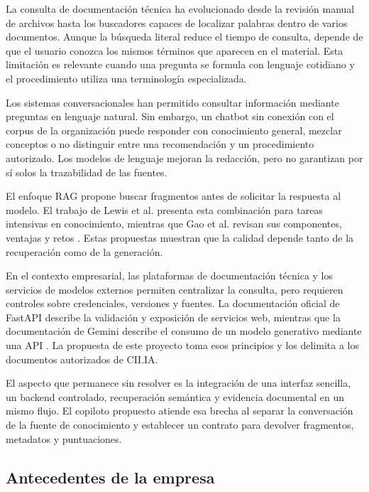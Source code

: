La consulta de documentación técnica ha evolucionado desde la revisión manual de archivos hasta los buscadores capaces de localizar palabras dentro de varios documentos. Aunque la búsqueda literal reduce el tiempo de consulta, depende de que el usuario conozca los mismos términos que aparecen en el material. Esta limitación es relevante cuando una pregunta se formula con lenguaje cotidiano y el procedimiento utiliza una terminología especializada.

Los sistemas conversacionales han permitido consultar información mediante preguntas en lenguaje natural. Sin embargo, un chatbot sin conexión con el corpus de la organización puede responder con conocimiento general, mezclar conceptos o no distinguir entre una recomendación y un procedimiento autorizado. Los modelos de lenguaje mejoran la redacción, pero no garantizan por sí solos la trazabilidad de las fuentes.

El enfoque RAG propone buscar fragmentos antes de solicitar la respuesta al modelo. El trabajo de Lewis et al. presenta esta combinación para tareas intensivas en conocimiento, mientras que Gao et al. revisan sus componentes, ventajas y retos \cite{lewis2020rag,gao2023rag}. Estas propuestas muestran que la calidad depende tanto de la recuperación como de la generación.

En el contexto empresarial, las plataformas de documentación técnica y los servicios de modelos externos permiten centralizar la consulta, pero requieren controles sobre credenciales, versiones y fuentes. La documentación oficial de FastAPI describe la validación y exposición de servicios web, mientras que la documentación de Gemini describe el consumo de un modelo generativo mediante una API \cite{fastapiDocs,googleGeminiApi}. La propuesta de este proyecto toma esos principios y los delimita a los documentos autorizados de CII.IA.

El aspecto que permanece sin resolver es la integración de una interfaz sencilla, un backend controlado, recuperación semántica y evidencia documental en un mismo flujo. El copiloto propuesto atiende esa brecha al separar la conversación de la fuente de conocimiento y establecer un contrato para devolver fragmentos, metadatos y puntuaciones.


\subsection{Antecedentes de la empresa} \label{sec:antecedentes_empresa} %

